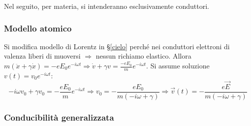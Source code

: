 \documentclass[a4paper]{scrartcl}
\numberwithin{equation}{subsection}
\theoremstyle{style1}
\begin{document}
Nel seguito, per materia, si intenderanno esclusivamente conduttori.
\subsubsection{Modello atomico}

Si modifica modello di Lorentz in \S\ref{cielo} perch\'e nei conduttori elettroni di valenza liberi di muoversi $\Rightarrow $ nessun richiamo elastico. Allora $m(\ddot{x}+\gamma\dot{x}) = - eE_0e^{-i\omega t}\Rightarrow \dot{v}+\gamma v = \frac{-eE_0}{m}e^{-i\omega t} $. Si assume soluzione $v(t) = v_0 e^{-i\omega t} $:
\begin{equation}
		-i\omega v_0 + \gamma v_0 = - \frac{eE_0}{m}e^{-i\omega t} \Rightarrow v_0 = - \frac{eE_0}{m(-i\omega + \gamma)}\Rightarrow \vec{v}(t) = - \frac{e\vec{E}}{m(-i\omega + \gamma)}
\end{equation}
\subsubsection{Conducibilit\`a generalizzata}
\end{document}
